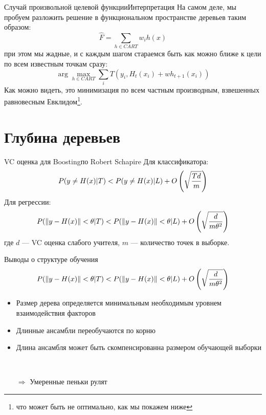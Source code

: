 \documentclass[14pt, fleqn, xcolor={dvipsnames, table}]{beamer}
\begin{document}
\begin{frame}{Случай произвольной целевой функции}{Интерпретация}
На самом деле, мы пробуем разложить решение в функциональном пространстве деревьев таким образом:
$$
\hat{F} = \sum_{h \in CART} w_i h(x) 
$$
при этом мы жадные, и с каждым шагом стараемся быть как можно ближе к цели по всем известным точкам сразу:
$$
\arg \max_{h \in CART} \sum_i T(y_i, H_t(x_i) + w h_{t+1}(x_i))
$$
Как можно видеть, это минимизация по всем частным производным, взвешенных равновесным Евклидом\footnote{что может быть не оптимально, как мы покажем ниже}.
\end{frame}

\section{Глубина деревьев}
\begin{frame}{VC оценка для Boosting}{по Robert Schapire}
Для классификатора:
$$
P(y \ne H(x) | T) < P(y \ne H(x) | L) + O\left(\sqrt{T d \over m}\right)
$$
Для регрессии:
$$
P(\|y - H(x)\| < \theta | T) < P(\|y - H(x)\| < \theta | L) + O\left(\sqrt{d \over m \theta^2}\right)
$$
где $d$ --- VC оценка слабого учителя, $m$ --- количество точек в выборке. 
\end{frame}

\begin{frame}{Выводы о структуре обучения}
$$
P(\|y - H(x)\| < \theta | T) < P(\|y - H(x)\| < \theta | L) + O\left(\sqrt{d \over m \theta^2}\right)
$$
\begin{itemize}
  \item Размер дерева определяется минимальным необходимым уровнем взаимодействия факторов
  \item Длинные ансамбли переобучаются по корню
  \item Длина ансамбля может быть скомпенсированна размером обучающей выборки
  \item[~]
  \item[\color{blue}$\Rightarrow$] Умеренные пеньки рулят
\end{itemize}
\end{frame}
\end{document}
